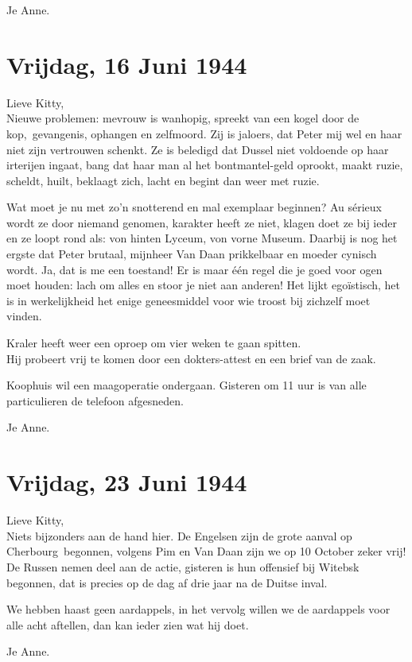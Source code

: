 \documentclass{book}
\begin{document}
Je Anne.

\chapter{Vrijdag, 16 Juni 1944}

Lieve Kitty,\\Nieuwe problemen: mevrouw is wanhopig, spreekt van een
kogel door de kop,~gevangenis, ophangen en zelfmoord. Zij is jaloers,
dat Peter mij wel en haar niet zijn vertrouwen schenkt. Ze is beledigd
dat Dussel niet voldoende op haar irterijen ingaat, bang dat haar man al
het bontmantel-geld oprookt, maakt ruzie, scheldt, huilt, beklaagt zich,
lacht en begint dan weer met ruzie.

Wat moet je nu met zo'n snotterend en mal exemplaar beginnen? Au sérieux
wordt ze door niemand genomen, karakter heeft ze niet, klagen doet ze
bij ieder en ze loopt rond als: von hinten Lyceum, von vorne Museum.
Daarbij is nog het ergste dat Peter brutaal, mijnheer Van Daan
prikkelbaar en moeder cynisch wordt. Ja, dat is me een toestand! Er is
maar één regel die je goed voor ogen moet houden: lach om alles en stoor
je niet aan anderen! Het lijkt egoïstisch, het is in werkelijkheid het
enige geneesmiddel voor wie troost bij zichzelf moet vinden.

Kraler heeft weer een oproep om vier weken te gaan spitten.\\Hij
probeert vrij te komen door een dokters-attest en een brief van de zaak.

Koophuis wil een maagoperatie ondergaan. Gisteren om 11 uur is van alle
particulieren de telefoon afgesneden.

Je Anne.

\chapter{Vrijdag, 23 Juni 1944}

Lieve Kitty,\\Niets bijzonders aan de hand hier. De Engelsen zijn de
grote aanval op Cherbourg~begonnen, volgens Pim en Van Daan zijn we op
10 October zeker vrij! De Russen nemen deel aan de actie, gisteren is
hun offensief bij Witebsk begonnen, dat is precies op de dag af drie
jaar na de Duitse inval.

We hebben haast geen aardappels, in het vervolg willen we de aardappels
voor alle acht aftellen, dan kan ieder zien wat hij doet.

Je Anne.
\end{document}
